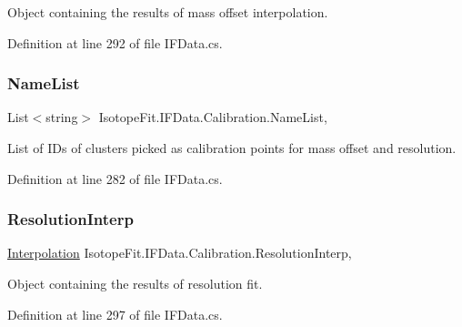 Object containing the results of mass offset interpolation. 



Definition at line 292 of file I\+F\+Data.\+cs.

\mbox{\label{class_isotope_fit_1_1_i_f_data_1_1_calibration_a2e347f087df878f22010302bda7db4be}} 
\subsubsection{\texorpdfstring{Name\+List}{NameList}}
{\footnotesize\ttfamily List$<$string$>$ Isotope\+Fit.\+I\+F\+Data.\+Calibration.\+Name\+List\hspace{0.3cm}{\ttfamily [get]}, {\ttfamily [set]}}



List of I\+Ds of clusters picked as calibration points for mass offset and resolution. 



Definition at line 282 of file I\+F\+Data.\+cs.

\mbox{\label{class_isotope_fit_1_1_i_f_data_1_1_calibration_ab8db2fa10ee3de8f8deca251f4bd3518}} 
\subsubsection{\texorpdfstring{Resolution\+Interp}{ResolutionInterp}}
{\footnotesize\ttfamily \hyperlink{class_isotope_fit_1_1_interpolation}{Interpolation} Isotope\+Fit.\+I\+F\+Data.\+Calibration.\+Resolution\+Interp\hspace{0.3cm}{\ttfamily [get]}, {\ttfamily [set]}}



Object containing the results of resolution fit. 



Definition at line 297 of file I\+F\+Data.\+cs.

